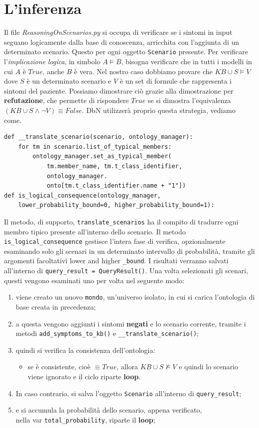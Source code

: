 \section{L'inferenza}
Il file \emph{ReasoningOnScenarios.py} si occupa di verificare se i sintomi in input
seguano logicamente dalla base di conoscenza, arricchita con l'aggiunta di un determinato scenario.
Questo per ogni oggetto \texttt{Scenario} presente.
Per verificare l'\textit{implicazione logica}, in simbolo $  A \models B $, bisogna verificare che
in tutti i modelli in cui $ A $ è $ True $, anche $ B $ è vera. Nel nostro caso dobbiamo provare
che $ KB \cup S \models V $ dove $ S $ è un determinato scenario e $ V $ è un set di formule che
rappresenta i sintomi del paziente. Possiamo dimostrare ciò grazie 
alla dimostrazione per \textbf{refutazione}, che permette di
rispondere $ True $ se si dimostra l'equivalenza $ (KB \cup S \wedge\neg V) \equiv False $.
DbN utilizzerà proprio questa strategia, vediamo come.
\begin{verbatim}
def __translate_scenario(scenario, ontology_manager):
	for tm in scenario.list_of_typical_members:
		ontology_manager.set_as_typical_member(
			tm.member_name, tm.t_class_identifier, 
			ontology_manager.
			onto[tm.t_class_identifier.name + "1"])
def is_logical_consequence(ontology_manager, 
	lower_probability_bound=0, higher_probability_bound=1):
\end{verbatim}
Il metodo, di supporto, \texttt{translate_scenarios} ha il compito di tradurre 
ogni membro tipico presente all’interno dello scenario.
Il metodo \texttt{is_logical_consequence} gestisce l'intera fase di verifica, 
opzionalmente esaminando solo gli scenari in un determinato intervallo di probabilità, tramite
gli argomenti facoltativi lower and higher \texttt{_bound}.
I risultati verranno salvati all'interno di \texttt{query_result = QueryResult()}.
Una volta selezionati gli scenari, questi vengono esaminati uno per volta nel seguente modo:
\begin{enumerate}
	\item viene creato un nuovo \texttt{mondo}, un'universo isolato, in cui si carica
	 	l'ontologia di base creata in precedenza;
	\item a questa vengono aggiunti i sintomi \textbf{negati} e lo scenario corrente, tramite i metodi
	 \texttt{add_symptoms_to_kb()} e \texttt{__translate_scenario()};
	\item quindi si verifica la consistenza dell'ontologia:
	\begin{itemize}
		\item se è consistente, cioè $ \equiv True $, allora $ KB \cup S \not\models V $ 
			e quindi lo scenario viene ignorato e il ciclo riparte \textbf{loop}.
	\end{itemize}
	\item In caso contrario, si salva l'oggetto \texttt{Scenario} 
		all'interno di \texttt{query_result};
	\item e si accumula la probabilità dello scenario, appena verificato, \\
		nella var \texttt{total_probability}, riparte il \textbf{loop}; 		
\end{enumerate}
